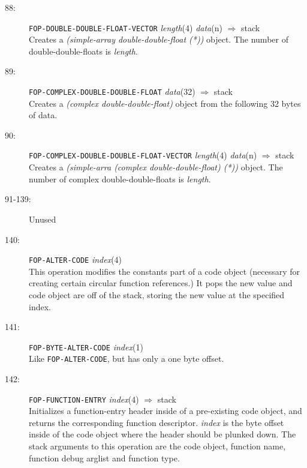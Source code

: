 \begin{description}
\item[88:] \hspace{2em} {\tt FOP-DOUBLE-DOUBLE-FLOAT-VECTOR} \hspace{2em} {\it length}(4) {\it data}(n)
 \hspace{2em} $\Rightarrow$ \hspace{2em} stack\\
Creates a {\it (simple-array double-double-float (*))} object.  The number of double-double-floats is {\it length}.

\item[89:] \hspace{2em} {\tt FOP-COMPLEX-DOUBLE-DOUBLE-FLOAT} \hspace{2em} {\it data}(32)
 \hspace{2em} $\Rightarrow$ \hspace{2em} stack\\
Creates a {\it (complex double-double-float)} object from the following 32 bytes of data.

\item[90:] \hspace{2em} {\tt FOP-COMPLEX-DOUBLE-DOUBLE-FLOAT-VECTOR} \hspace{2em} {\it length}(4) {\it data}(n)
 \hspace{2em} $\Rightarrow$ \hspace{2em} stack\\
Creates a {\it (simple-arra (complex double-double-float) (*))} object.  The number of complex double-double-floats is {\it length}.

\item[91-139:] Unused

\item[140:] \hspace{2em} {\tt FOP-ALTER-CODE} \hspace{2em} {\it index}(4)\\
This operation modifies the constants part of a code object (necessary for
creating certain circular function references.)  It pops the new value and code
object are off of the stack, storing the new value at the specified index.

\item[141:] \hspace{2em} {\tt FOP-BYTE-ALTER-CODE} \hspace{2em} {\it index}(1)\\
Like {\tt FOP-ALTER-CODE}, but has only a one byte offset.

\item[142:] \hspace{2em} {\tt FOP-FUNCTION-ENTRY} \hspace{2em} {\it index}(4)
\hspace{2em} $\Rightarrow$ \hspace{2em} stack\\
Initializes a function-entry header inside of a pre-existing code object, and
returns the corresponding function descriptor.  {\it index} is the byte offset
inside of the code object where the header should be plunked down.  The stack
arguments to this operation are the code object, function name, function debug
arglist and function type.


\end{description}
